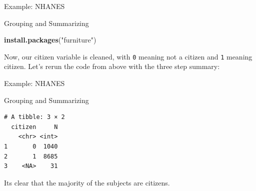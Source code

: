 \documentclass[ignorenonframetext,]{beamer}
\newenvironment{Shaded}{\begin{snugshade}}{\end{snugshade}}
\newcommand{\KeywordTok}[1]{\textcolor[rgb]{0.13,0.29,0.53}{\textbf{{#1}}}}
\newcommand{\DataTypeTok}[1]{\textcolor[rgb]{0.13,0.29,0.53}{{#1}}}
\newcommand{\DecValTok}[1]{\textcolor[rgb]{0.00,0.00,0.81}{{#1}}}
\newcommand{\StringTok}[1]{\textcolor[rgb]{0.31,0.60,0.02}{{#1}}}
\newcommand{\NormalTok}[1]{{#1}}
\begin{document}
\begin{frame}[fragile]{Example: NHANES}

\begin{block}{Grouping and Summarizing}

\begin{Shaded}
\begin{Highlighting}[]
\KeywordTok{install.packages}\NormalTok{(}\StringTok{"furniture"}\NormalTok{)}
\end{Highlighting}
\end{Shaded}

\begin{Shaded}
\end{Shaded}

Now, our citizen variable is cleaned, with \texttt{0} meaning not a
citizen and \texttt{1} meaning citizen. Let's rerun the code from above
with the three step summary:

\end{block}

\end{frame}

\begin{frame}[fragile]{Example: NHANES}

\begin{block}{Grouping and Summarizing}

\begin{Shaded}
\end{Shaded}

\begin{verbatim}
# A tibble: 3 × 2
  citizen     N
    <chr> <int>
1       0  1040
2       1  8685
3    <NA>    31
\end{verbatim}

Its clear that the majority of the subjects are citizens.

\end{block}

\end{frame}
\end{document}
